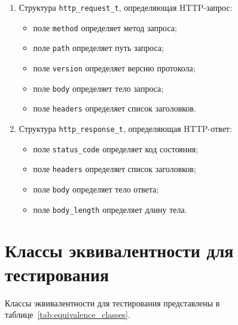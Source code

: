 \begin{enumerate}
	\newpage
	
	\item Структура \texttt{http\_request\_t}, определяющая HTTP-запрос:
	\begin{itemize}
		\item поле \texttt{method} определяет метод запроса;
		\item поле \texttt{path} определяет путь запроса;
		\item поле \texttt{version} определяет версию протокола;
		\item поле \texttt{body} определяет тело запроса;
		\item поле \texttt{headers} определяет список заголовков.
	\end{itemize}
	
	\item Структура \texttt{http\_response\_t}, определяющая HTTP-ответ:
	\begin{itemize}
		\item поле \texttt{status\_code} определяет код состояния;
		\item поле \texttt{headers} определяет список заголовков;
		\item поле \texttt{body} определяет тело ответа;
		\item поле \texttt{body\_length} определяет длину тела.
	\end{itemize}
\end{enumerate}

\newpage

\section{Классы эквивалентности для тестирования}

Классы эквивалентности для тестирования представлены в таблице~\ref{tab:equivalence_classes}.

